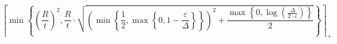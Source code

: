 \[\left\lceil \min\left\{ \left(\frac{R}{t}\right)^{2}, \frac{R}{t} \cdot \sqrt{\left(\min\left\{ \frac{1}{2}, \max\left\{ 0, 1 - \frac{\varepsilon}{\Delta} \right\} \right\}\right)^{2} + \frac{\max\left\{ 0, \log\left(\frac{\Delta}{2 \cdot \varepsilon}\right) \right\}}{2}} \right\} \right\rceil_{+}\]
